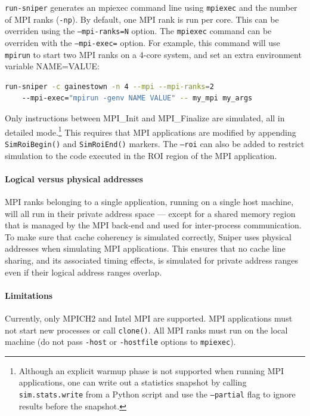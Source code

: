 \documentclass[a4paper,11pt,titlepage]{article}
\newcommand{\cmd}[1]{{\tt #1}}
\newcommand{\opt}[1]{{\tt #1}}
\begin{document}
\cmd{run-sniper} generates an mpiexec command line using \cmd{mpiexec} and the number of MPI ranks
(\cmd{-np}). By default, one MPI rank is run per core. This can be overriden using the \cmd{--mpi-ranks=N}
option. The \cmd{mpiexec} command can be overriden with the \cmd{--mpi-exec=} option. For example,
this command will use \cmd{mpirun} to start two MPI ranks on a 4-core system, and set an extra environment
variable NAME=VALUE:

\begin{lstlisting}[label=lst:running-mpi-apps-advanced,caption=Extended MPI options,rulecolor=\color{DarkSlateBlue},language=Bash,deletekeywords=test]
run-sniper -c gainestown -n 4 --mpi --mpi-ranks=2
    --mpi-exec="mpirun -genv NAME VALUE" -- my_mpi my_args
\end{lstlisting}

Only instructions between MPI\_Init and MPI\_Finalize are simulated, all in detailed mode.\footnote{
Although an explicit warmup phase is not supported when running MPI applications, one can write out a statistics snapshot
by calling \cmd{sim.stats.write} from a Python script and use the \opt{--partial} flag to ignore results before the snapshot.}
This requires that MPI applications are modified by appending \opt{SimRoiBegin()} and \opt{SimRoiEnd()} markers.
The \cmd{--roi} can also be added to restrict simulation to the code executed in the ROI region of the MPI application.

\paragraph{Logical versus physical addresses} MPI ranks belonging to a single application, running on
a single host machine, will all run in their private address space --- except for a shared memory region
that is managed by the MPI back-end and used for inter-process communication. To make sure that 
cache coherency is simulated correctly, Sniper uses physical addresses when simulating MPI applications.
This ensures that no cache line sharing, and its associated timing effects, is simulated for private
address ranges even if their logical address ranges overlap.

\paragraph{Limitations}
Currently, only MPICH2 and Intel MPI are supported. MPI applications must not start new
processes or call \cmd{clone()}. All MPI ranks must run on the local machine (do not pass \opt{-host}
or \opt{-hostfile} options to \cmd{mpiexec}).
\end{document}

